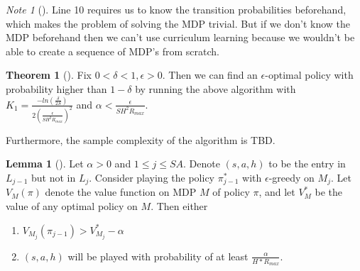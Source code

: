 \documentclass[12pt, letterpaper]{article}
\theoremstyle{definition}
\newtheorem*{thm}{Theorem}
\newtheorem*{lemma}{Lemma}
\theoremstyle{remark}
\newtheorem*{note}{Note}
\begin{document}
\begin{note}[]
    \color{red}
    Line 10 requires us to know the transition probabilities beforehand, which makes the problem of solving the MDP trivial. But if we don't know the MDP beforehand then we can't use curriculum learning because we wouldn't be able to create a sequence of MDP's from scratch.
\end{note}

\begin{thm}[]
    Fix \(0 < \delta < 1, \epsilon > 0\). Then we can find an \(\epsilon\)-optimal policy with probability higher than \(1 - \delta\) by running the above algorithm with \(K_1 = \frac{-ln(\frac{\delta}{2S})}{2(\frac{\epsilon}{SH^2 R_{max}})^2}\) and \(\alpha < \frac{\epsilon}{SH^2 R_{max}}\).

    Furthermore, the sample complexity of the algorithm is TBD.
\end{thm}


\begin{lemma}[]
    Let \(\alpha > 0\) and \(1 \leq j \leq SA\). Denote \((s, a, h)\) to be the entry in \(L_{j-1}\) but not in \(L_{j}\). Consider playing the policy \(\pi_{j-1}^*\) with \(\epsilon\)-greedy on \(M_j\). Let \(V_{M}(\pi)\) denote the value function on MDP \(M\) of policy \(\pi\), and let \(V^*_{M}\) be the value of any optimal policy on \(M\). Then either

    \begin{enumerate}
        \item \(V_{M_j} (\pi_{j-1}) > V^*_{M_j} - \alpha\)
        \item \((s, a, h)\) will be played with probability of at least \(\frac{\alpha}{H*R_{max}}\).
    \end{enumerate}
    
\end{lemma}
\end{document}

